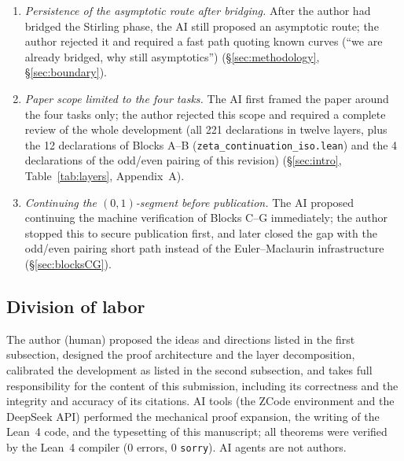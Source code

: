 \documentclass{article}
\begin{document}
\begin{enumerate}
\item \emph{Persistence of the asymptotic route after bridging.} After the
author had bridged the Stirling phase, the AI still proposed an asymptotic
route; the author rejected it and required a fast path quoting known curves
(``we are already bridged, why still asymptotics'')
(\S\ref{sec:methodology}, \S\ref{sec:boundary}).
\item \emph{Paper scope limited to the four tasks.} The AI first framed the
paper around the four tasks only; the author rejected this scope and
required a complete review of the whole development (all 221 declarations
in twelve layers, plus the 12 declarations of Blocks A--B
(\texttt{zeta\_continuation\_iso.lean}) and the 4 declarations of the
odd/even pairing of this
revision) (\S\ref{sec:intro}, Table~\ref{tab:layers},
Appendix~A).
\item \emph{Continuing the $(0,1)$-segment before publication.} The AI
proposed continuing the machine verification of Blocks C--G immediately;
the author stopped this to secure publication first, and later closed the
gap with the odd/even pairing short path instead of the Euler--Maclaurin
infrastructure (\S\ref{sec:blocksCG}).
\end{enumerate}

\subsection*{Division of labor}
The author (human) proposed the ideas and directions listed in the first
subsection, designed the proof architecture and the layer decomposition,
calibrated the development as listed in the second subsection, and takes
full responsibility for the content of this submission, including its
correctness and the integrity and accuracy of its citations. AI tools (the
ZCode environment and the DeepSeek API) performed the
mechanical proof expansion, the writing of
the Lean~4 code, and the typesetting of this manuscript; all theorems were
verified by the Lean~4 compiler (0 errors, 0 \texttt{sorry}). AI agents are
not authors.
\end{document}
